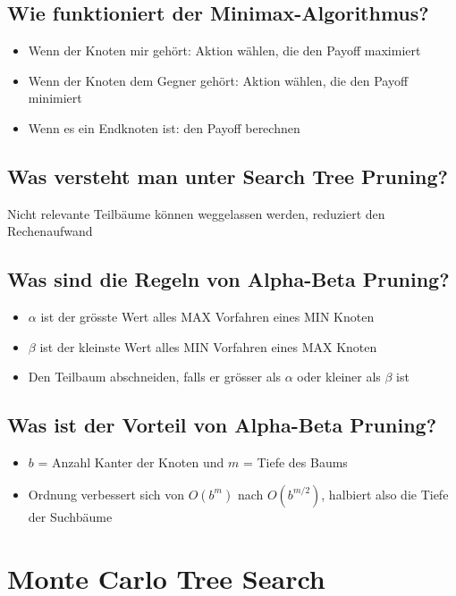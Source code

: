 \documentclass[a4paper]{article}
\begin{document}
		\subsection{Wie funktioniert der Minimax-Algorithmus?}
		
		\begin{itemize}
			\item Wenn der Knoten mir gehört: Aktion wählen, die den Payoff maximiert
			\item Wenn der Knoten dem Gegner gehört: Aktion wählen, die den Payoff minimiert
			\item Wenn es ein Endknoten ist: den Payoff berechnen
		\end{itemize}
	
		\subsection{Was versteht man unter Search Tree Pruning?}
		
		Nicht relevante Teilbäume können weggelassen werden, reduziert den Rechenaufwand
		
		\subsection{Was sind die Regeln von Alpha-Beta Pruning?}
		
		\begin{itemize}
			\item $\alpha$ ist der grösste Wert alles MAX Vorfahren eines MIN Knoten
			\item $\beta$ ist der kleinste Wert alles MIN Vorfahren eines MAX Knoten
			\item Den Teilbaum abschneiden, falls er grösser als $\alpha$ oder kleiner als $\beta$ ist
		\end{itemize}
		
		\subsection{Was ist der Vorteil von Alpha-Beta Pruning?}
		
		\begin{itemize}
			\item $b$ = Anzahl Kanter der Knoten und $m$ = Tiefe des Baums
			\item Ordnung verbessert sich von $O(b^{m})$ nach $O(b^{m/2})$, halbiert also die Tiefe der Suchbäume
		\end{itemize}
	
	\section{Monte Carlo Tree Search}
	
\end{document}
